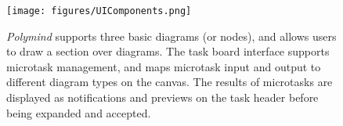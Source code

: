 
\begin{figure}[ht]
\centering
\texttt{[image: figures/UIComponents.png]}
\caption{\textit{Polymind} supports three basic diagrams (or nodes), and allows users to draw a section over diagrams. The task board interface supports microtask management, and maps microtask input and output to different diagram types on the canvas. The results of microtasks are displayed as notifications and previews on the task header before being expanded and accepted.}
\label{fig:diagrams}
\end{figure}